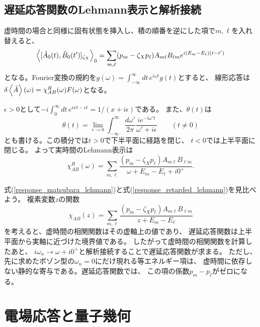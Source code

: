 \documentclass[a4paper,12pt]{jsarticle}
\begin{document}
\subsection{遅延応答関数のLehmann表示と解析接続}
虚時間の場合と同様に固有状態を挿入し、積の順番を逆にした項で$m,\ell$を入れ替えると、
\begin{equation}
  \ev{[\hat A_0(t),\hat B_0(t')]_{\zeta_X}}_0
    =\sum_{m,\ell}(p_m-\zeta_X p_\ell)A_{m\ell}B_{\ell m}
       e^{i(E_m-E_\ell)(t-t')}
\end{equation}
となる。Fourier変換の規約を$g(\omega)=\int_{-\infty}^{\infty}dt\,e^{i\omega t}g(t)$とすると、
線形応答は$\delta\ev{\hat A}(\omega)=\chi^R_{AB}(\omega)F(\omega)$となる。

$\epsilon>0$として$-i\int_0^\infty dt\,e^{ixt-\epsilon t}=1/(x+i\epsilon)$である。
また、$\theta(t)$は
\begin{equation}
  \theta(t)=\lim_{\epsilon\rightarrow0}\int_{-\infty}^{\infty}
    \frac{d\omega'}{2\pi}\frac{i e^{-i\omega't}}{\omega'+i\epsilon}
    \qquad (t\ne 0)
\end{equation}
とも書ける。この積分では$t>0$で下半平面に経路を閉じ、
$t<0$では上半平面に閉じる。
よって実時間のLehmann表示は
\begin{equation}
  \chi^R_{AB}(\omega)=\sum_{m,\ell}
    \frac{(p_m-\zeta_X p_\ell)A_{m\ell}B_{\ell m}}
         {\omega+E_m-E_\ell+i0^+}.
  \label{response_retarded_lehmann}
\end{equation}

式(\ref{response_matsubara_lehmann})と式(\ref{response_retarded_lehmann})を見比べよう。
複素変数$z$の関数
\begin{equation}
  \chi_{AB}(z)=\sum_{m,\ell}
     \frac{(p_m-\zeta_X p_\ell)A_{m\ell}B_{\ell m}}{z+E_m-E_\ell}
\end{equation}
を考えると、虚時間の相関関数はその虚軸上の値であり、
遅延応答関数は上半平面から実軸に近づけた境界値である。
したがって虚時間の相関関数を計算したあと、
$i\omega_n\longrightarrow\omega+i0^+$と解析接続することで遅延応答関数が求まる。
ただし、先に求めたボゾン型の$\omega_n=0$にだけ現れる等エネルギー項は、
虚時間に依存しない静的な寄与である。遅延応答関数では、
この項の係数$p_m-p_\ell$がゼロになる。

\section{電場応答と量子幾何}
\end{document}
